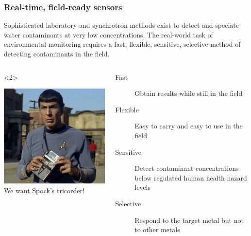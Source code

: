 \documentclass[10pt, xcolor=x11names, compress]{beamer}
\begin{document}
\begin{frame}
  \frametitle{Real-time, field-ready sensors}

  Sophisticated laboratory and synchrotron methods exist to detect
  and speciate water contaminants at very low concentrations.  The
  real-world task of environmental monitoring requires a
  fast, flexible, sensitive, selective method of detecting
  contaminants \alert{in the field}.

  \medskip

  \begin{columns}[T]
    \begin{column}{0.25\linewidth}<2>
      \begin{center}
        \includegraphics[width=1.1\linewidth]{images/spock+tricorder.jpg}\\
        \small We want Spock's tricorder!
      \end{center}
    \end{column}
    \begin{column}{0.75\linewidth}
      \begin{description}
      \item[Fast] Obtain results while still in the field
      \item[Flexible] Easy to carry and easy to use in the field
      \item[Sensitive] Detect contaminant concentrations below
        regulated human health hazard levels
      \item[Selective] Respond to the target metal but not to other
        metals
      \end{description}
    \end{column}
  \end{columns}
\end{frame}
\end{document}
